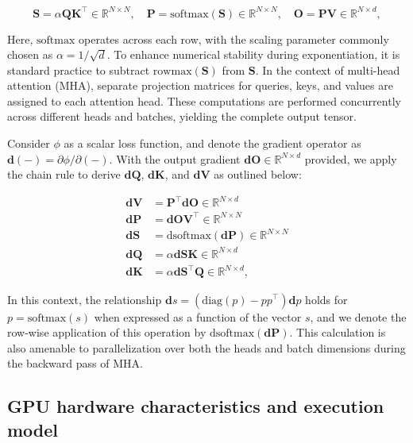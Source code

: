 \begin{equation*}
  \mathbf{S} = \alpha \mathbf{Q} \mathbf{K}^\top \in \mathbb{R}^{N \times N}, \quad \mathbf{P} = \mathrm{softmax}(\mathbf{S}) \in \mathbb{R}^{N \times N}, \quad \mathbf{O} = \mathbf{P}\mathbf{V} \in \mathbb{R}^{N \times d},
\end{equation*}

Here, $\mathrm{softmax}$ operates across each row, with the scaling parameter commonly chosen as $\alpha = 1/\sqrt{d}$. To enhance numerical stability during exponentiation, it is standard practice to subtract $\mathrm{rowmax}(\mathbf{S})$ from $\mathbf{S}$. In the context of multi-head attention (MHA), separate projection matrices for queries, keys, and values are assigned to each attention head. These computations are performed concurrently across different heads and batches, yielding the complete output tensor.

Consider $\phi$ as a scalar loss function, and denote the gradient operator as $\mathbf{d}(-) = \partial \phi / \partial (-)$. With the output gradient $\mathbf{dO} \in \mathbb{R}^{N \times d}$ provided, we apply the chain rule to derive $\mathbf{dQ}$, $\mathbf{dK}$, and $\mathbf{dV}$ as outlined below:

\begin{align*}
  \mathbf{dV} &= \mathbf{P}^\top \mathbf{dO} \in \mathbb{R}^{N \times d} \\
  \mathbf{dP} &= \mathbf{dO} \mathbf{V}^\top \in \mathbb{R}^{N \times N} \\
  \mathbf{dS} &= \mathrm{dsoftmax} (\mathbf{dP}) \in \mathbb{R}^{N \times N} \\
  \mathbf{dQ} &= \alpha \mathbf{dS} \mathbf{K} \in \mathbb{R}^{N \times d} \\
  \mathbf{dK} &= \alpha \mathbf{dS}^\top \mathbf{Q} \in \mathbb{R}^{N \times d},
\end{align*}

In this context, the relationship $\mathbf{d}s = (\mathrm{diag}(p) - p p^\top)\mathbf{d}p$ holds for $p = \mathrm{softmax}(s)$ when expressed as a function of the vector $s$, and we denote the row-wise application of this operation by $\mathrm{dsoftmax}(\mathbf{dP})$. This calculation is also amenable to parallelization over both the heads and batch dimensions during the backward pass of MHA.

\subsection{GPU hardware characteristics and execution model}
\label{subsec:hardware}

